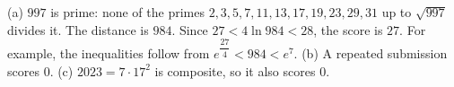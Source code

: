 (a) $997$ is prime: none of the primes $2,3,5,7,11,13,17,19,23,29,31$ up to $\sqrt{997}$ divides it. The distance is $984$. Since $27<4\ln984<28$, the score is $\boxed{27}$. For example, the inequalities follow from $e^{\dfrac{27}{4}}<984<e^7$.
(b) A repeated submission scores $\boxed0$. (c) $2023=7\cdot17^2$ is composite, so it also scores $\boxed0$.
